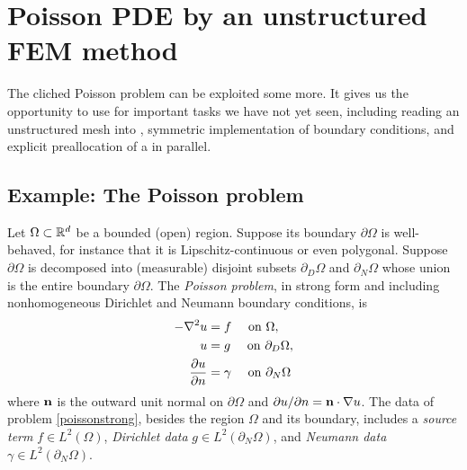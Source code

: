 \newcommand{\CODELOC}{c/ch7/}

\chapter{Poisson PDE by an unstructured FEM method}
\label{chap:unstructured}

The cliched Poisson problem can be exploited some more.  It gives us the opportunity to use \PETSc for important tasks we have not yet seen, including reading an unstructured mesh into \PETSc \pVecs, symmetric implementation of boundary conditions, and explicit preallocation of a \pMat in parallel.

\section{Example: The Poisson problem}

Let $\Omega \subset \mathbb{R}^d$ be a bounded (open) region.  Suppose its boundary $\partial\Omega$ is well-behaved, for instance that it is Lipschitz-continuous \citep[section 1.2]{Ciarlet} or even polygonal.  Suppose $\partial\Omega$ is decomposed into (measurable) disjoint subsets $\partial_D \Omega$ and $\partial_N \Omega$ whose union is the entire boundary $\partial \Omega$.  The \emph{Poisson problem}, in strong form and including nonhomogeneous Dirichlet and Neumann boundary conditions, is
\begin{align}
- \nabla^2 u &= f \quad \text{ on } \Omega, \label{poissonstrong} \\
u &= g \quad \text{ on } \partial_D \Omega, \notag \\
\frac{\partial u}{\partial n} &= \gamma \quad \text{ on } \partial_N \Omega \notag
\end{align}
where $\mathbf{n}$ is the outward unit normal on $\partial \Omega$ and $\partial u/\partial n = \mathbf{n} \cdot \nabla u$.  The data of problem \eqref{poissonstrong}, besides the region $\Omega$ and its boundary, includes a \emph{source term} $f\in L^2(\Omega)$, \emph{Dirichlet data} $g\in L^2(\partial_N \Omega)$, and \emph{Neumann data} $\gamma\in L^2(\partial_N \Omega)$.

